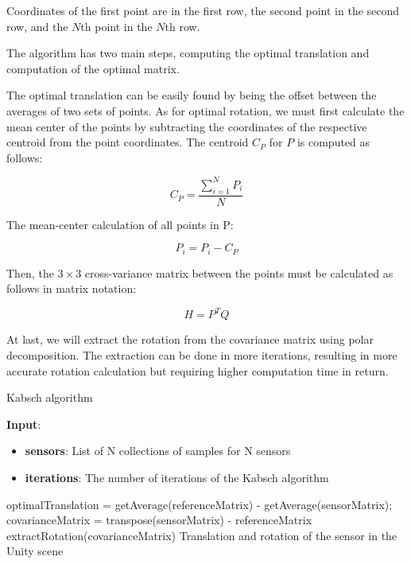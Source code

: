 Coordinates of the first point are in the first row, the second point in the second row, and the $N$th point in the $N$th row.

The algorithm has two main steps, computing the optimal translation and computation of the optimal matrix.

The optimal translation can be easily found by being the offset between the averages of two sets of points. As for optimal rotation, we must first calculate the mean center of the points by subtracting the coordinates of the respective centroid from the point coordinates. The centroid $C_P$ for $P$ is computed as follows:

\begin{equation}
    {C_P = {\frac{\sum_{i=1}^{N}P_i}{N}}}
\end{equation}

The mean-center calculation of all points in P:

\begin{equation}
    {P_i = P_i - C_P}
\end{equation}

Then, the $3\times3$ cross-variance matrix between the points must be calculated as follows in matrix notation:

\begin{equation}
    {H = P^T Q}
\end{equation}

At last, we will extract the rotation from the covariance matrix using polar decomposition. The extraction can be done in more iterations, resulting in more accurate rotation calculation but requiring higher computation time in return.

\begin{algorithm}
    \caption{Kabsch algorithm}
    \label{alg:devicePositioning}
    \hspace*{\algorithmicindent} \textbf{Input}: 
        \begin{itemize}
            \item \textbf{sensors}: List of N collections of samples for N sensors
            \item \textbf{iterations}: The number of iterations of the Kabsch algorithm
        \end{itemize}
    \begin{algorithmic}[1]
            \State optimalTranslation = getAverage(referenceMatrix) - getAverage(sensorMatrix);
            \State covarianceMatrix = transpose(sensorMatrix) - referenceMatrix
                \State extractRotation(covarianceMatrix)
            \EndFor
            \State Translation and rotation of the sensor in the Unity scene
        \EndFor
    \end{algorithmic} 
\end{algorithm}


